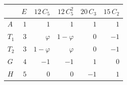 \begin{tabular}{lrrrrr}
\hline
 & $E$ & $12\,C_5$ & $12\,C_5^2$ & $20\,C_3$ & $15\,C_2$ \\
\hline
$A$ & $1$ & $1$ & $1$ & $1$ & $1$ \\
$T_1$ & $3$ & $\varphi$ & $1 - \varphi$ & $0$ & $-1$ \\
$T_2$ & $3$ & $1 - \varphi$ & $\varphi$ & $0$ & $-1$ \\
$G$ & $4$ & $-1$ & $-1$ & $1$ & $0$ \\
$H$ & $5$ & $0$ & $0$ & $-1$ & $1$ \\
\hline
\end{tabular}
